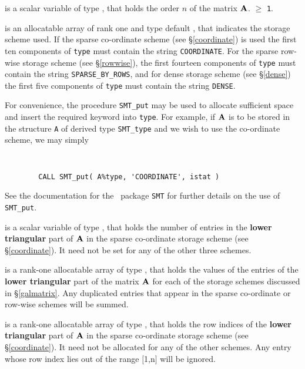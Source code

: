 \documentclass{galahad}
\begin{document}
\begin{description}

 is a scalar variable of type \integer, that holds
the order $n$ of the matrix  ${\mathbf{A}}$.
 $\geq$ {\tt 1}.

 is an allocatable array of rank one and type default \character, that
indicates the storage scheme used. If the
sparse co-ordinate scheme (see \S\ref{coordinate}) is used
the first ten components of {\tt type} must contain the
string {\tt COORDINATE}.
For the sparse row-wise storage scheme (see \S\ref{rowwise}),
the first fourteen components of {\tt type} must contain the
string {\tt SPARSE\_BY\_ROWS}, and
for dense storage scheme (see \S\ref{dense})
the first five components of {\tt type} must contain the
string {\tt DENSE}.

For convenience, the procedure {\tt SMT\_put}
may be used to allocate sufficient space and insert the required keyword
into {\tt type}.
For example, if ${\mathbf{A}}$ is to be stored in the structure {\tt A}
of derived type {\tt SMT\_type} and we wish to use
the co-ordinate scheme, we may simply
{\tt
\begin{verbatim}
        CALL SMT_put( A%type, 'COORDINATE', istat )
\end{verbatim}
}
\noindent
See the documentation for the \galahad\ package {\tt SMT}
for further details on the use of {\tt SMT\_put}.

 is a scalar variable of type \integer, that
holds the number of entries in the {\bf lower triangular} part of ${\mathbf{A}}$
in the sparse co-ordinate storage scheme (see \S\ref{coordinate}).
It need not be set for any of the other three schemes.

 is a rank-one allocatable array of type \realdp, that holds
the values of the entries of the {\bf lower triangular} part
of the matrix ${\mathbf{A}}$ for each of the
storage schemes discussed in \S\ref{galmatrix}.
Any duplicated entries that appear in the sparse
co-ordinate or row-wise schemes will be summed.

 is a rank-one allocatable array of type \integer,
that holds the row indices of the {\bf lower triangular} part of ${\mathbf{A}}$
in the sparse co-ordinate storage
scheme (see \S\ref{coordinate}).
It need not be allocated for any of the other schemes.
Any entry whose row index lies out of the range $[$1,n$]$ will be ignored.


\end{description}
\end{document}
